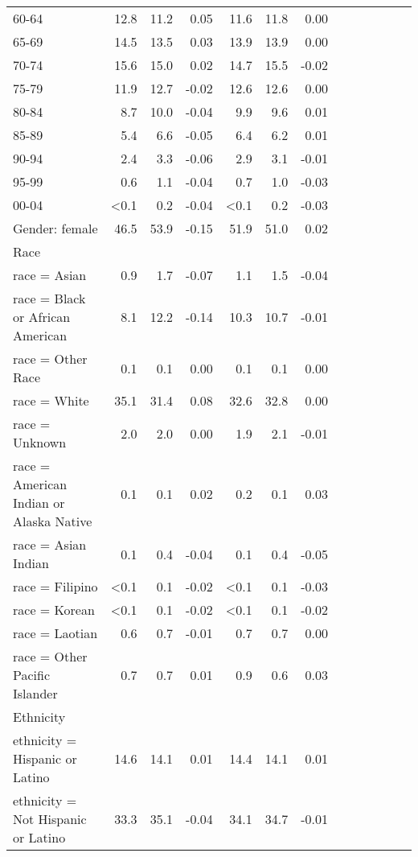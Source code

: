 \documentclass[11pt,]{article}
\begin{document}
\begin{longtable}{lrrrrrrrrrrrr}
      60-64 & 12.8 & 11.2 &  0.05 & 11.6 & 11.8 &  0.00 \\ 
      65-69 & 14.5 & 13.5 &  0.03 & 13.9 & 13.9 &  0.00 \\ 
      70-74 & 15.6 & 15.0 &  0.02 & 14.7 & 15.5 & -0.02 \\ 
      75-79 & 11.9 & 12.7 & -0.02 & 12.6 & 12.6 &  0.00 \\ 
      80-84 &  8.7 & 10.0 & -0.04 &  9.9 &  9.6 &  0.01 \\ 
      85-89 &  5.4 &  6.6 & -0.05 &  6.4 &  6.2 &  0.01 \\ 
      90-94 &  2.4 &  3.3 & -0.06 &  2.9 &  3.1 & -0.01 \\ 
      95-99 &  0.6 &  1.1 & -0.04 &  0.7 &  1.0 & -0.03 \\ 
      00-04 & <0.1 &  0.2 & -0.04 & <0.1 &  0.2 & -0.03 \\ 
  Gender: female & 46.5 & 53.9 & -0.15 & 51.9 & 51.0 &  0.02 \\ 
  Race &    &    &     &    &    &     \\ 
      race = Asian &  0.9 &  1.7 & -0.07 &  1.1 &  1.5 & -0.04 \\ 
      race = Black or African American &  8.1 & 12.2 & -0.14 & 10.3 & 10.7 & -0.01 \\ 
      race = Other Race &  0.1 &  0.1 &  0.00 &  0.1 &  0.1 &  0.00 \\ 
      race = White & 35.1 & 31.4 &  0.08 & 32.6 & 32.8 &  0.00 \\ 
      race = Unknown &  2.0 &  2.0 &  0.00 &  1.9 &  2.1 & -0.01 \\ 
      race = American Indian or Alaska Native &  0.1 &  0.1 &  0.02 &  0.2 &  0.1 &  0.03 \\ 
      race = Asian Indian &  0.1 &  0.4 & -0.04 &  0.1 &  0.4 & -0.05 \\ 
      race = Filipino & <0.1 &  0.1 & -0.02 & <0.1 &  0.1 & -0.03 \\ 
      race = Korean & <0.1 &  0.1 & -0.02 & <0.1 &  0.1 & -0.02 \\ 
      race = Laotian &  0.6 &  0.7 & -0.01 &  0.7 &  0.7 &  0.00 \\ 
      race = Other Pacific Islander &  0.7 &  0.7 &  0.01 &  0.9 &  0.6 &  0.03 \\ 
  Ethnicity &    &    &     &    &    &     \\ 
      ethnicity = Hispanic or Latino & 14.6 & 14.1 &  0.01 & 14.4 & 14.1 &  0.01 \\ 
      ethnicity = Not Hispanic or Latino & 33.3 & 35.1 & -0.04 & 34.1 & 34.7 & -0.01 \\ 

\end{longtable}
\end{document}

